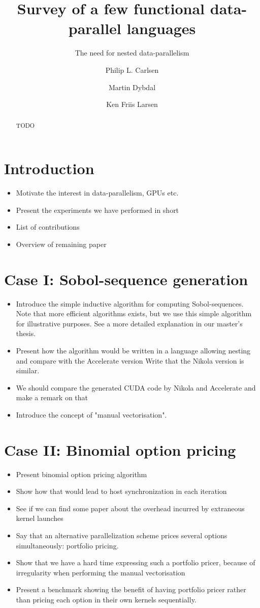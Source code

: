 \documentclass{llncs2e/llncs}
\title{Survey of a few functional data-parallel languages}
\subtitle{The need for nested data-parallelism} \author{Philip L. Carlsen \and Martin Dybdal \and Ken Friis Larsen}
\institute{University of Copenhagen \\ \email{plcplc@gmail.com,
    dybber@dybber.dk, kflarsen@diku.dk}}
\begin{document}
\maketitle

\begin{abstract}
  TODO
\end{abstract}

\section{Introduction}
\begin{itemize}
\item Motivate the interest in data-parallelism, GPUs etc.
\item Present the experiments we have performed in short
\item List of contributions
\item Overview of remaining paper
\end{itemize}

\section{Case I: Sobol-sequence generation}
\begin{itemize}
\item Introduce the simple inductive algorithm for computing
  Sobol-sequences. Note that more efficient algorithms exists, but
  we use this simple algorithm for illustrative purposes. See a more
  detailed explanation in our master's thesis.

\item Present how the algorithm would be written in a language
  allowing nesting and compare with the Accelerate version
  Write that the Nikola version is similar.
\item We should compare the generated CUDA code by Nikola and
  Accelerate and make a remark on that
\item Introduce the concept of "manual vectorisation".
\end{itemize}

\section{Case II: Binomial option pricing}
\begin{itemize}
\item Present binomial option pricing algorithm
\item Show how that would lead to host synchronization in each iteration
\item See if we can find some paper about the overhead incurred by
  extraneous kernel launches
\item Say that an alternative parallelization scheme prices several
  options simultaneously: portfolio pricing.
\item Show that we have a hard time expressing such a portfolio
  pricer, because of irregularity when performing the manual
  vectorisation
\item Present a benchmark showing the benefit of having portfolio
  pricer rather than pricing each option in their own kernels
  sequentially.
\end{itemize}
\end{document}
